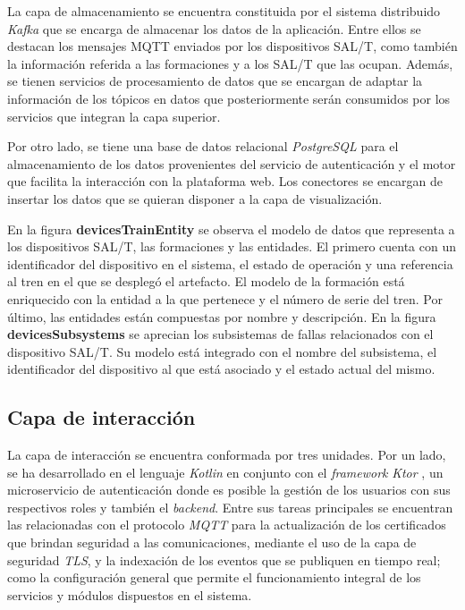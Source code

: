La capa de almacenamiento se encuentra constituida por el sistema distribuido \textit{Kafka} que se encarga de almacenar los datos de la aplicación. Entre ellos se destacan los mensajes MQTT enviados por los dispositivos SAL/T, como también la información referida a las formaciones y a los SAL/T que las ocupan. Además, se tienen servicios de procesamiento de datos que se encargan de adaptar la información de los tópicos en datos que posteriormente serán consumidos por los servicios que integran la capa superior.

Por otro lado, se tiene una base de datos relacional \textit{PostgreSQL} \cite{b13} para el almacenamiento de los datos provenientes del servicio de autenticación y el motor que facilita la interacción con la plataforma web. Los conectores se encargan de insertar los datos que se quieran disponer a la capa de visualización.


En la figura \textbf{devicesTrainEntity} se observa el modelo de datos que representa a los dispositivos SAL/T, las formaciones y las entidades. 
El primero cuenta con un identificador del dispositivo en el sistema, el estado de operación y una referencia al tren en el que se desplegó el artefacto. 
El modelo de la formación está enriquecido con la entidad a la que pertenece y el número de serie del tren. 
Por último, las entidades están compuestas por nombre y descripción.
En la figura \textbf{devicesSubsystems} se aprecian los subsistemas de fallas relacionados con el dispositivo SAL/T. Su modelo está integrado con el nombre del subsistema, el identificador del dispositivo al que está asociado y el estado actual del mismo. 

\subsection{Capa de interacción}

La capa de interacción se encuentra conformada por tres unidades. Por un lado, se ha desarrollado en el lenguaje \textit{Kotlin} \cite{b14} en conjunto con el \textit{framework} \textit{Ktor} \cite{b15}, un microservicio de autenticación donde es posible la gestión de los usuarios con sus respectivos roles y también el \textit{backend}. Entre sus tareas principales se encuentran las relacionadas con el protocolo \textit{MQTT} para la actualización de los certificados que brindan seguridad a las comunicaciones, mediante el uso de la capa de seguridad \textit{TLS}, y la indexación de los eventos que se publiquen en tiempo real; como la configuración general que permite el funcionamiento integral de los servicios y módulos dispuestos en el sistema. \\

